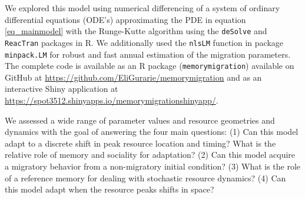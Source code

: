 \documentclass[utf8]{frontiersSCNS} %
\begin{document}
We explored this model using numerical differencing of a system of ordinary differential equations (ODE's) approximating the PDE in equation \ref{eq_mainmodel} with the Runge-Kutte algorithm using the \texttt{deSolve} \citep{Soetaert2010} and \texttt{ReacTran} \citep{Soetaert2012} packages in R. We additionally used the \texttt{nlsLM} function in package \texttt{minpack.LM} \citep{minpack.lm} for robust and fast annual estimation of the migration parameters. The complete code is available as an R package (\texttt{memorymigration}) available on GitHub at \url{https://github.com/EliGurarie/memorymigration} and as an interactive Shiny application at \url{https://spot3512.shinyapps.io/memorymigrationshinyapp/}.

We assessed a wide range of parameter values and resource geometries and dynamics with the goal of answering the four main questions: (1) Can this model adapt to a discrete shift in peak resource location and timing?  What is the relative role of memory and sociality for adaptation? (2) Can this model acquire a migratory behavior from a non-migratory initial condition? (3) What is the role of a reference memory for dealing with stochastic resource dynamics? (4) Can this model adapt when the resource peaks shifts in space?
\end{document}
